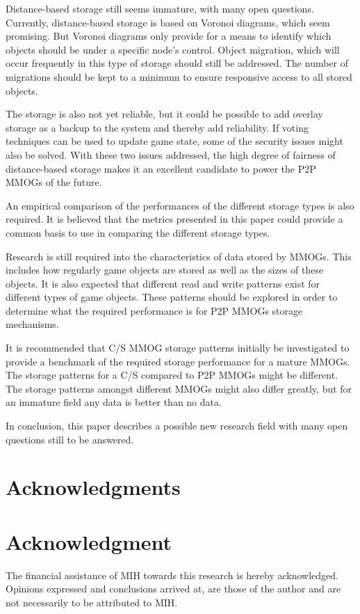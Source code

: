 \documentclass[10pt,a4paper,journal,cspaper,compsoc]{IEEEtran}
\begin{document}
Distance-based storage still seems immature, with many open questions. Currently, distance-based storage is based on Voronoi diagrams, which seem
promising. But Voronoi diagrams only provide for a means to identify which objects should be under a specific node's control. Object migration, which
will occur frequently in this type of storage should still be addressed. The number of migrations should be kept to a minimum to ensure responsive
access to all stored objects.

The storage is also not yet reliable, but it could be possible to add overlay storage as a backup to the system and thereby add reliability. If
voting techniques can be used to update game state, some of the security issues might also be solved. With these two issues addressed, the high
degree of fairness of distance-based storage makes it an excellent candidate to power the P2P MMOGs of the future.

An empirical comparison of the performances of the different storage types is also required. It is believed that the metrics presented in this paper
could provide a common basis to use in comparing the different storage types.

Research is still required into the characteristics of data stored by MMOGs. This includes how regularly game objects are stored as well as the sizes
of these objects. It is also expected that different read and write patterns exist for different types of game objects. These patterns should be
explored in order to determine what the required performance is for P2P MMOGs storage mechanisms.

It is recommended that C/S MMOG storage patterns initially be investigated to provide a benchmark of the required storage performance for a mature
MMOGs. The storage patterns for a C/S compared to P2P MMOGs might be different. The storage patterns amongst different MMOGs might also differ
greatly, but for an immature field any data is better than no data.

In conclusion, this paper describes a possible new research field with many open questions still to be answered.

\ifCLASSOPTIONcompsoc
  \section*{Acknowledgments}
\else
  \section*{Acknowledgment}
\fi

The financial assistance of MIH towards this research is hereby acknowledged. Opinions expressed and conclusions arrived at, are those of the author
and are not necessarily to be attributed to MIH.




\end{document}
